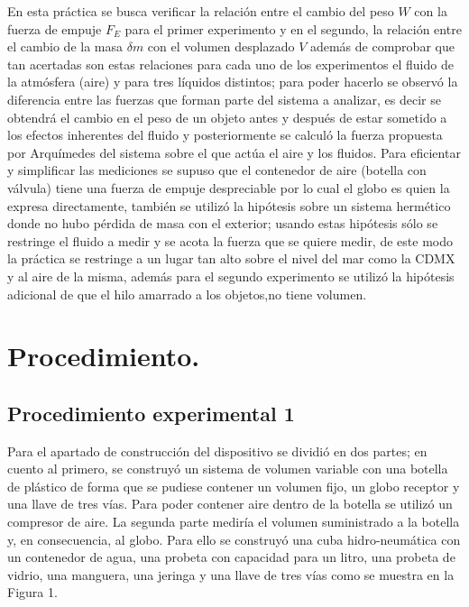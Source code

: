 \documentclass[a4paper]{article}
\begin{document}
En esta práctica se busca verificar la relación entre el cambio del peso $W$ con la fuerza de empuje $F_{E}$ para el primer experimento y en el segundo, la relación entre el cambio de la masa $\delta m$ con el volumen desplazado $V$ además de comprobar que tan acertadas son estas relaciones para cada uno de los experimentos el fluido de la atmósfera (aire) y para tres líquidos distintos; para poder hacerlo se observó la diferencia entre las fuerzas que forman parte del sistema a analizar, es decir se obtendrá el cambio en el peso de un objeto antes y después de estar sometido a los efectos inherentes del fluido y posteriormente se calculó la fuerza propuesta por Arquímedes del sistema sobre el que actúa el aire y los fluidos. Para eficientar y simplificar las mediciones se supuso que el contenedor de aire (botella con válvula) tiene una fuerza de empuje despreciable por lo cual el globo es quien la expresa directamente, también se utilizó la hipótesis sobre un sistema hermético donde no hubo pérdida de masa con el exterior; usando estas hipótesis sólo se restringe el fluido a medir y se acota la fuerza que se quiere medir, de este modo la práctica se restringe a un lugar tan alto sobre el nivel del mar como la CDMX y al aire de la misma, además para el segundo experimento se utilizó la hipótesis adicional de que el hilo amarrado a los objetos,no tiene volumen.

\section*{Procedimiento.}
\subsection*{Procedimiento experimental 1}
Para el apartado de construcción del dispositivo se dividió en dos partes; en cuento al primero, se construyó un sistema de volumen variable con una botella de plástico de forma que se pudiese contener un volumen fijo, un globo receptor y una llave de tres vías. Para poder contener aire dentro de la botella se utilizó un compresor de aire. La segunda parte mediría el volumen suministrado a la botella y, en consecuencia, al globo. Para ello se construyó una cuba hidro-neumática con un contenedor de agua, una probeta con capacidad para un litro, una probeta de vidrio, una manguera, una jeringa y una llave de tres vías como se muestra en la Figura 1. 
\end{document}
